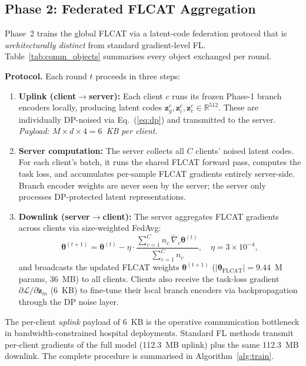 \documentclass{ieeeaccess}
\begin{document}
\subsection{Phase 2: Federated FLCAT Aggregation}
\label{subsec:phase2}

Phase~2 trains the global FLCAT via a latent-code federation protocol
that is \emph{architecturally distinct} from standard gradient-level FL.
Table~\ref{tab:comm_objects} summarises every object exchanged per round.

\textbf{Protocol.}
Each round $t$ proceeds in three steps:
\begin{enumerate}
\item \textbf{Uplink (client$\to$server):} Each client $c$ runs its
  frozen Phase-1 branch encoders locally, producing latent codes
  $\mathbf{z}_g^c, \mathbf{z}_i^c, \mathbf{z}_e^c \in\mathbb{R}^{512}$.
  These are individually DP-noised via Eq.~(\ref{eq:dp}) and transmitted
  to the server. \emph{Payload: $M\!\times\! d\!\times\! 4 = 6$~KB per client.}

\item \textbf{Server computation:} The server collects all $C$ clients'
  noised latent codes. For each client's batch, it runs the shared FLCAT
  forward pass, computes the task loss, and accumulates per-sample FLCAT
  gradients entirely server-side. Branch encoder weights are never seen by
  the server; the server only processes DP-protected latent representations.

\item \textbf{Downlink (server$\to$client):} The server aggregates FLCAT
  gradients across clients via size-weighted FedAvg:
  \begin{equation}
  \boldsymbol{\theta}^{(t+1)} = \boldsymbol{\theta}^{(t)} -
  \eta\cdot\frac{\sum_{c=1}^{C}n_c\,\tilde{\nabla}_c\boldsymbol{\theta}^{(t)}}
  {\sum_{c=1}^{C}n_c},\quad\eta\!=\!3\times10^{-4},
  \label{eq:fedavg}
  \end{equation}
  and broadcasts the updated FLCAT weights $\boldsymbol{\theta}^{(t+1)}$
  ($|\boldsymbol{\theta}_{\mathrm{FLCAT}}|\!=\!9.44$~M params, 36~MB) to
  all clients. Clients also receive the task-loss gradient
  $\partial\mathcal{L}/\partial\tilde{\mathbf{z}}_m$ (6~KB) to fine-tune
  their local branch encoders via backpropagation through the DP noise layer.
\end{enumerate}

The per-client \emph{uplink} payload of 6~KB is the operative
communication bottleneck in bandwidth-constrained hospital deployments.
Standard FL methods transmit per-client gradients of the full model
(112.3~MB uplink) plus the same 112.3~MB downlink. The complete procedure
is summarised in Algorithm~\ref{alg:train}.
\end{document}
